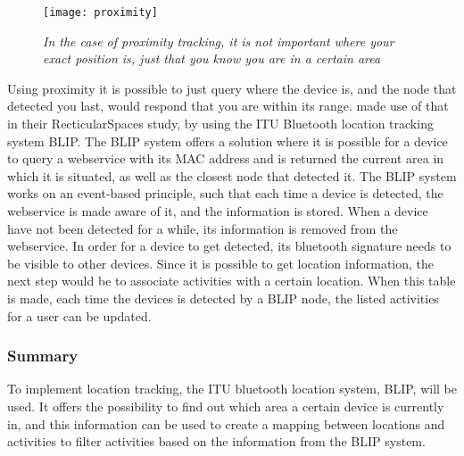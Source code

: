 \begin{figure}[ht!]
  \centering
    \texttt{[image: proximity]}
  \caption{\emph{In the case of proximity tracking, it is not important where your exact position is, just that you know you are in a certain area}}
  \label{fig:proximity}
\end{figure}

Using proximity it is possible to just query where the device is, and the node that detected you last, would respond that you are within its range. \citet{bardram2012} made use of that in their RecticularSpaces study, by using the ITU Bluetooth location tracking system BLIP. The BLIP system offers a solution where it is possible for a device to query a webservice with its MAC address and is returned the current area in which it is situated, as well as the closest node that detected it. The BLIP system works on an event-based principle, such that each time a device is detected, the webservice is made aware of it, and the information is stored. When a device have not been detected for a while, its information is removed from the webservice. In order for a device to get detected, its bluetooth signature needs to be visible to other devices. Since it is possible to get location information, the next step would be to associate activities with a certain location. When this table is made, each time the devices is detected by a BLIP node, the listed activities for a user can be updated.
 
\subsubsection{Summary}
To implement location tracking, the ITU bluetooth location system, BLIP, will be used. It offers the possibility to find out which area a certain device is currently in, and this information can be used to create a mapping between locations and activities to filter activities based on the information from the BLIP system.